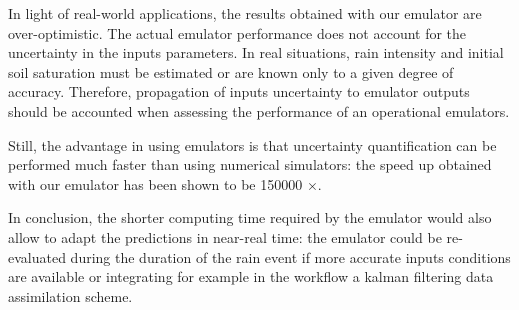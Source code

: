 In light of real-world applications, the results obtained with our emulator are over-optimistic.
The actual emulator performance does not account for the uncertainty in the inputs parameters. 
In real situations, rain intensity and initial soil saturation must be estimated or are known only to a given degree of accuracy. 
Therefore, propagation of inputs uncertainty to emulator outputs should be accounted when assessing the performance of an operational emulators.

Still, the advantage in using emulators is that uncertainty quantification can be performed much faster than using numerical simulators: the speed up obtained with our emulator has been shown to be \num{150000} $\times$. 

In conclusion, the shorter computing time required by the emulator would also allow to adapt the predictions in near-real time: the emulator could be re-evaluated during the duration of the rain event if more accurate inputs conditions are available or integrating for example in the workflow a kalman filtering data assimilation scheme. 
 
 
 



